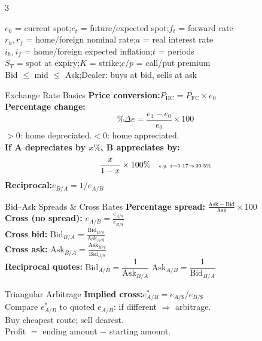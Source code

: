 \documentclass[7.5pt,a4paper]{article}
\newcommand{\dsp}{\displaystyle}
\newcommand{\rh}{r_{\!h}}
\newcommand{\rf}{r_{\!f}}
\newcommand{\ih}{i_h}
\newcommand{\iif}{i_f}          %
\newcommand{\kw}[1]{\textbf{#1}}
\newcommand{\ex}[1]{\textit{\fontsize{5.8}{7}\selectfont #1}}
\begin{document}
\begin{multicols}{3}


\begin{notebox}
$e_0$ = current spot;\quad $e_t$ = future/expected spot;\quad $f_t$ = forward rate\\
$\rh,\rf$ = home/foreign nominal rate;\quad $a$ = real interest rate\\
$\ih,\iif$ = home/foreign expected inflation;\quad $t$ = periods\\
$S_T$ = spot at expiry;\quad $K$ = strike;\quad $c/p$ = call/put premium\\
Bid $\leq$ mid $\leq$ Ask;\quad Dealer: buys at bid, sells at ask
\end{notebox}

\begin{fsect}{Exchange Rate Basics}
\kw{Price conversion:}\quad $P_{\mathrm{HC}} = P_{\mathrm{FC}}\times e_0$\\[2pt]
\kw{Percentage change:}
\[
  \%\Delta e = \frac{e_1-e_0}{e_0}\times 100
\]
$>0$: home depreciated.\quad $<0$: home appreciated.\\[2pt]
\kw{If A depreciates by $x\%$, B appreciates by:}
\[
  \frac{x}{1-x}\times 100\%
  \quad\ex{e.g.\ $x{=}0.17\!\Rightarrow\!20.5\%$}
\]
\kw{Reciprocal:}\quad $e_{B/A}=1/e_{A/B}$
\end{fsect}

\begin{fsect}{Bid--Ask Spreads \& Cross Rates}
\kw{Percentage spread:}\quad
$\dsp\frac{\mathrm{Ask}-\mathrm{Bid}}{\mathrm{Ask}}\times 100$\\[3pt]
\kw{Cross (no spread):}\quad
$\dsp e_{A/B}=\frac{e_{A/\$}}{e_{B/\$}}$\\[3pt]
\kw{Cross bid:}\quad
$\dsp\mathrm{Bid}_{B/A}=\frac{\mathrm{Bid}_{B/\$}}{\mathrm{Ask}_{A/\$}}$\\[3pt]
\kw{Cross ask:}\quad
$\dsp\mathrm{Ask}_{B/A}=\frac{\mathrm{Ask}_{B/\$}}{\mathrm{Bid}_{A/\$}}$\\[2pt]
\kw{Reciprocal quotes:}
$\mathrm{Bid}_{A/B}=\dfrac{1}{\mathrm{Ask}_{B/A}}$\quad
$\mathrm{Ask}_{A/B}=\dfrac{1}{\mathrm{Bid}_{B/A}}$
\end{fsect}

\begin{fsect}{Triangular Arbitrage}
\kw{Implied cross:}\quad $e_{A/B}^{*}=e_{A/\$}/e_{B/\$}$\\[1pt]
Compare $e_{A/B}^{*}$ to quoted $e_{A/B}$:
if different $\Rightarrow$ arbitrage.\\[1pt]
Buy cheapest route; sell dearest.\\
Profit $=$ ending amount $-$ starting amount.
\end{fsect}


\end{multicols}
\end{document}
